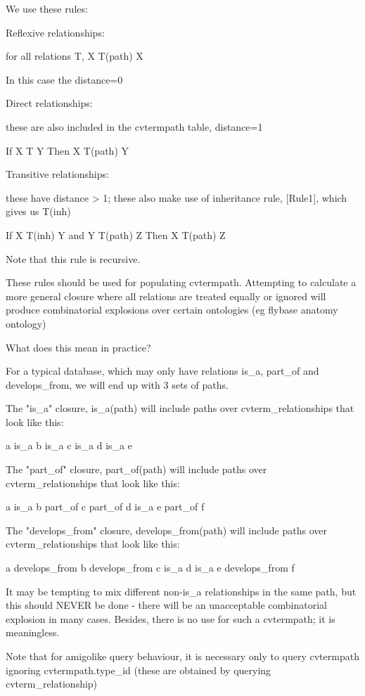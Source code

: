 We use these rules:

Reflexive relationships:

for all relations T,
  X T(path) X 

In this case the distance=0

Direct relationships:

these are also included in the cvtermpath table, distance=1

 If   X T       Y
 Then X T(path) Y

Transitive relationships:

these have distance > 1; these also make use of inheritance rule,
[Rule1], which gives us T(inh)

If   X T(inh)     Y
and  Y T(path)    Z
Then X T(path)    Z

Note that this rule is recursive.

These rules should be used for populating cvtermpath. Attempting to
calculate a more general closure where all relations are
treated equally or ignored will produce combinatorial explosions over
certain ontologies (eg flybase anatomy ontology)

What does this mean in practice?

For a typical database, which may only have relations is_a,
part_of and develops_from, we will end up with 3 sets of paths.

The "is_a" closure, is_a(path) will include paths over
cvterm_relationships that look like this:

a is_a b is_a c is_a d is_a e

The "part_of" closure, part_of(path) will include paths over
cvterm_relationships that look like this:

a is_a b part_of c part_of d is_a e part_of f

The "develops_from" closure, develops_from(path) will include paths over
cvterm_relationships that look like this:

a develops_from b develops_from c is_a d is_a e develops_from f

It may be tempting to mix different non-is_a relationships in the same
path, but this should NEVER be done - there will be an unacceptable
combinatorial explosion in many cases. Besides, there is no use for
such a cvtermpath; it is meaningless.

Note that for amigolike query behaviour, it is necessary only to query
cvtermpath ignoring cvtermpath.type_id (these are obtained by querying
cvterm_relationship)



